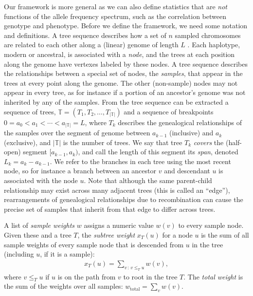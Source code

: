 \documentclass{article}
\newcommand{\treeseq}{\mathbb{T}} %
\newcommand{\iw}{w} %
\newcommand{\tiw}{w_\text{total}} %
\newcommand{\nw}{x} %
\begin{document}
Our framework is more general as we can also define statistics that are
\emph{not} functions of the allele frequency spectrum, such as the correlation between genotype and phenotype.
Before we define the framework, we need some notation and definitions.
A tree sequence describes how a set of $n$ sampled chromosomes
are related to each other along a (linear) genome of length $L$ \citep{kelleher2016efficient,kelleher2018efficient}.
Each haplotype, modern or ancestral, is associated with a \emph{node},
and the trees at each position along the genome have vertexes labeled by these nodes.
A tree sequence describes the relationships between a special set of nodes, the \emph{samples},
that appear in the trees at every point along the genome.
The other (non-sample) nodes may not appear in every tree,
as for instance if a portion of an ancestor's genome was not inherited by any of the samples.
From the tree sequence can be extracted a sequence of trees,
$\treeseq = (T_1, T_2, \ldots, T_{|\treeseq|})$
and a sequence of breakpoints $0 = a_0 < a_1 < \cdots < a_{|\treeseq|} = L$,
where $T_k$ describes the genealogical relationships of the samples
over the segment of genome between $a_{k-1}$ (inclusive) and $a_k$ (exclusive),
and $|\treeseq|$ is the number of trees.
We say that tree $T_k$ \emph{covers} the (half-open) segment $[a_{k-1}, a_k)$,
and call the length of this segment its \emph{span}, denoted $L_k = a_k - a_{k-1}$.
We refer to the branches in each tree using the most recent node,
so for instance a branch between an ancestor $v$ and descendant $u$
is associated with the node $u$.
Note that although the same parent-child relationship may exist across many adjacent trees
(this is called an ``edge''),
rearrangements of genealogical relationships due to recombination
can cause the precise set of samples that inherit from that edge to differ across trees.

\begin{definition} \label{defn:weights}
    A list of \emph{sample weights} $\iw$ assigns a numeric value $\iw(v)$
    to every sample node.
    Given these and a tree $T$,
    the \emph{subtree weight} $\nw_T(u)$ for a node $u$ is the sum of all sample weights
    of every sample node that is descended from $u$ in the tree (including $u$, if it is a sample):
    \begin{align*}
        \nw_T(u) = \sum_{v \,:\, v \le_T u} \iw(v) ,
    \end{align*}
    where $v \le_T u$ if $u$ is on the path from $v$ to root in the tree $T$.
    The \emph{total weight} is the sum of the weights over all samples:
    $\tiw = \sum_v \iw(v)$.
\end{definition}
\end{document}

